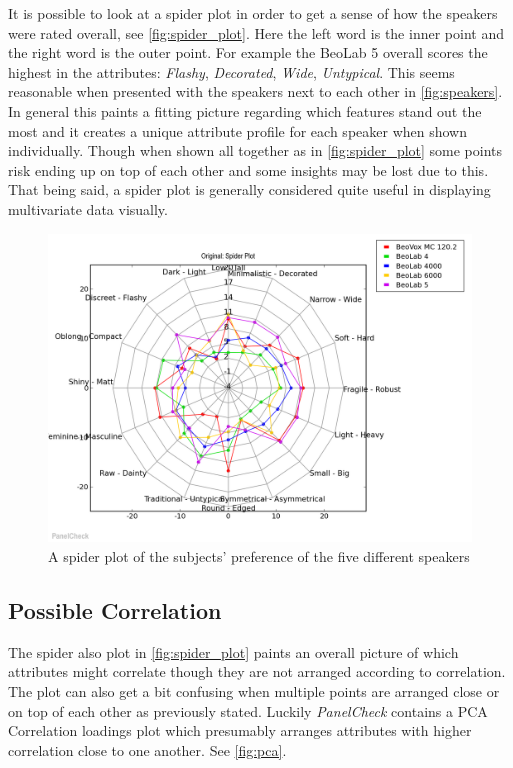 It is possible to look at a spider plot in order to get a sense of how the speakers were rated overall, see \autoref{fig:spider_plot}. Here the left word is the inner point and the right word is the outer point. For example the BeoLab 5 overall scores the highest in the attributes: \textit{Flashy}, \textit{Decorated}, \textit{Wide}, \textit{Untypical}. This seems reasonable when presented with the speakers next to each other in \autoref{fig:speakers}. In general this paints a fitting picture regarding which features stand out the most and it creates a unique attribute profile for each speaker when shown individually. Though when shown all together as in \autoref{fig:spider_plot} some points risk ending up on top of each other and some insights may be lost due to this. That being said, a spider plot is generally considered quite useful in displaying multivariate data visually. 

\begin{figure}[H]
\centering
\includegraphics[width = \textwidth]{Figure/spider_plot.png}
\caption{A spider plot of the subjects' preference of the five different speakers}
\label{fig:spider_plot}
\end{figure}

\subsection*{Possible Correlation}
The spider also plot in \autoref{fig:spider_plot} paints an overall picture of which attributes might correlate though they are not arranged according to correlation. The plot can also get a bit confusing when multiple points are arranged close or on top of each other as previously stated. Luckily \textit{PanelCheck} contains a PCA Correlation loadings plot which presumably arranges attributes with higher correlation close to one another. See \autoref{fig:pca}.


